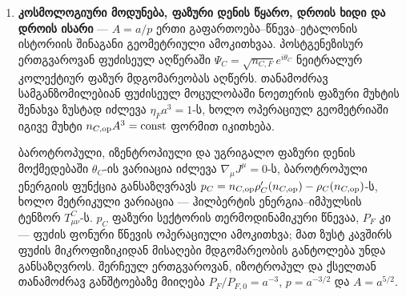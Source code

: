 \documentclass[11pt,a4paper]{article}
\begin{document}
\begin{enumerate}[label=\arabic*.]
მორფოლოგიური რუკა დისკურ და სპირალურ წყობას მოწესრიგებულ დინებას, ელიფსურ წყობას კი უფრო იზოტროპულ ან ქაოსურ რეჟიმს უკავშირებს. გროვების მასის ბალანსი სამ არხს აერთიანებს: გრძელტალღოვან კვანძურ დეფიციტს, გალაქტიკათა შორეულ წნევით ველებსა და გროვის მასშტაბის გრიგალურ მეხსიერებას, თითოეულის ერთხელ აღრიცხვით. ერთიანი დიდი კოვარიანტული მოქმედების ტომას–ფერმის წონასწორობიდან გამოყვანილია პოტენციალის სიღრმის ზღურბლის კანონი ($\sqrt{|\Phi(r)|} > v_{\rm trap} \equiv c_0\sqrt{1-\omega_C/\mu_{C0}} \approx 500\text{ კმ/წმ}$): 163-ვე SPARC გალაქტიკა ($\max V_{\rm obs} = 383.0\text{ კმ/წმ}$) რჩება ზღურბლს ქვემოთ ($Q_C = 0$), ხოლო მდიდარი გროვები კვეთს ზღურბლს ($Q_C > 0$) და აყალიბებს ანალიზურ $n=1$ ლეინ–ემდენის კონდენსატურ ბირთვს $\rho_C(r) = \rho_{c0}\frac{\sin(k_C r)}{k_C r}$. ტყვიის გროვის (1E 0657-558) 2D მოდელში ეს შეუჯახებელი $Q_C$ ჯიბეები აღადგენს სუსტი ლინზირების კონვერგენციის ორივე პიკს უშუალოდ გალაქტიკებთან ($x_{\rm main}=-347.0\text{ კპს}$, $\kappa \approx 0.439$ და $x_{\rm sub}=+354.0\text{ კპს}$, $\kappa \approx 0.316$, რენტგენული გაზიდან $187\text{ კპს}$ და $154\text{ კპს}$-ით წინ). შემდგომ მიკროსკოპულ ამოცანებად რჩება $v_{\rm trap}$ ზღურბლისა და გეომეტრიული პოლინომის წონების დისკრეტული კვანძური დინამიკიდან გამოყვანა, ცირკულაციის $\Gamma=nh/m$ დაკვანტვის შემოწმება და გროვების შერწყმის სრული 3D დროზე დამოკიდებული ჰიდროდინამიკურ–კონდენსატური სიმულაცია. გალაქტიკური რუკისა და კოსმოლოგიური ფაზური წყაროს ერთიანობას პირველადი CMB-ის ანიზოტროპია, BAO-ს $100\,h^{-1}\text{ მპკ}$ სახაზავი და დიდმასშტაბიანი სტრუქტურის სტატისტიკა ამოწმებს.
\item \textbf{კოსმოლოგიური მოდუნება, ფაზური დენის წყარო, დროის ხიდი და დროის ისარი} — $A=a/p$ ერთი გაფართოება–წნევა–ეტალონის ისტორიის შინაგანი გეომეტრიული ამოკითხვაა. პოსტგენეზისურ ერთგვაროვან ფუძისეულ აღწერაში $\Psi_C=\sqrt{n_{C,F}}e^{i\theta_C}$ ნეიტრალურ კოლექტიურ ფაზურ მდგომარეობას აღწერს. თანამოძრავ სამგანზომილებიან ფუძისეულ მოცულობაში ნოეთერის ფაზური მუხტის შენახვა ზუსტად იძლევა $\eta_Fa^3=1$-ს, ხოლო ოპერაციულ გეომეტრიაში იგივე მუხტი $n_{C,{\rm op}}A^3=\mathrm{const}$ ფორმით იკითხება.

ბაროტროპული, იზენტროპიული და უგრიგალო ფაზური დენის მოქმედებაში $\theta_C$-ის ვარიაცია იძლევა $\nabla_\mu J^\mu=0$-ს, ბაროტროპული ენერგიის ფუნქცია განსაზღვრავს $p_C=n_{C,{\rm op}}\rho_C'(n_{C,{\rm op}})-\rho_C(n_{C,{\rm op}})$-ს, ხოლო მეტრიკული ვარიაცია — ჰილბერტის ენერგია–იმპულსის ტენზორ $T^C_{\mu\nu}$-ს. $p_C$ ფაზური სექტორის თერმოდინამიკური წნევაა, $P_F$ კი — ფუძის ფონური წნევის ოპერაციული ამოკითხვა; მათ ზუსტ კავშირს ფუძის მიკროფიზიკიდან მისაღები მდგომარეობის განტოლება უნდა განსაზღვროს. შერჩეულ ერთგვაროვან, იზოტროპულ და ქსელთან თანამოძრავ განშტოებაზე მიიღება $P_F/P_{F,0}=a^{-3}$, $p=a^{-3/2}$ და $A=a^{5/2}$.


\end{enumerate}
\end{document}
